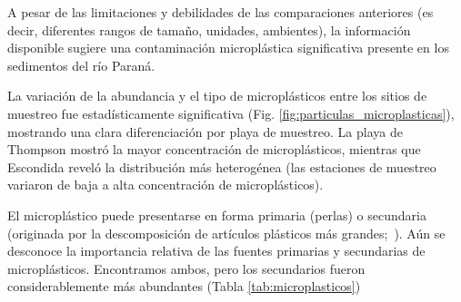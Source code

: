 A pesar de las limitaciones y debilidades de las comparaciones anteriores (es decir, diferentes rangos de tamaño, unidades, ambientes), la información disponible sugiere una contaminación microplástica significativa presente en los sedimentos del río Paraná.

La variación de la abundancia y el tipo de microplásticos entre los sitios de muestreo fue estadísticamente significativa (Fig. \ref{fig:particulas_microplasticas}), mostrando una clara diferenciación por playa de muestreo. La playa de Thompson mostró la mayor concentración de microplásticos, mientras que Escondida reveló la distribución más heterogénea (las estaciones de muestreo variaron de baja a alta concentración de microplásticos).

El microplástico puede presentarse en forma primaria (perlas) o secundaria (originada por la descomposición de artículos plásticos más grandes;~\cite{COLE20112588}). Aún se desconoce la importancia relativa de las fuentes primarias y secundarias de microplásticos. Encontramos ambos, pero los secundarios fueron considerablemente más abundantes (Tabla \ref{tab:microplasticos})

